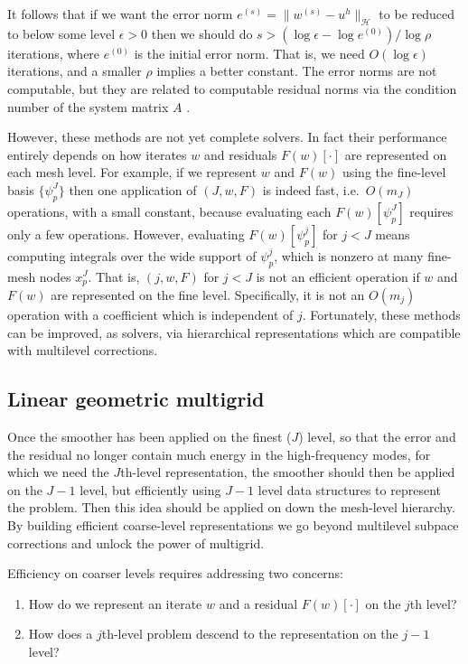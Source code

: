 \documentclass[letterpaper,final,12pt,reqno]{amsart}
\theoremstyle{claim}
\newcommand{\eps}{\epsilon}
\numberwithin{equation}{section}
\numberwithin{figure}{section}
\numberwithin{table}{section}
\begin{document}
It follows that if we want the error norm $e^{(s)} = \|w^{(s)}-u^h\|_{\mathcal{H}}$ to be reduced to below some level $\eps>0$ then we should do $s>(\log\eps - \log e^{(0)})/\log \rho$ iterations, where $e^{(0)}$ is the initial error norm.  That is, we need $O(\log\eps)$ iterations, and a smaller $\rho$ implies a better constant.  The error norms are not computable, but they are related to computable residual norms via the condition number of the system matrix $A$ \cite[Chapter 2]{Bueler2016}.

However, these  methods are not yet complete solvers.  In fact their performance entirely depends on how iterates $w$ and residuals $F(w)[\cdot]$ are represented on each mesh level.  For example, if we represent $w$ and $F(w)$ using the fine-level basis $\{\psi_p^J\}$ then one application of $(J,w,F)$ is indeed fast, i.e.~$O(m_J)$ operations, with a small constant, because evaluating each $F(w)[\psi_p^J]$ requires only a few operations.  However, evaluating $F(w)[\psi_p^j]$ for $j<J$ means computing integrals over the wide support of $\psi_p^j$, which is nonzero at many fine-mesh nodes $x_p^J$.  That is, $(j,w,F)$ for $j<J$ is not an efficient operation if $w$ and $F(w)$ are represented on the fine level.  Specifically, it is not an $O(m_j)$ operation with a coefficient which is independent of $j$.  Fortunately, these  methods can be improved, as solvers, via hierarchical representations which are compatible with multilevel corrections.

\subsection*{Linear geometric multigrid}  Once the smoother has been applied on the finest ($J$) level, so that the error and the residual no longer contain much energy in the high-frequency modes, for which we need the $J$th-level representation, the smoother should then be applied on the $J-1$ level, but efficiently using $J-1$ level data structures to represent the problem.  Then this idea should be applied on down the mesh-level hierarchy.  By building efficient coarse-level representations we go beyond multilevel subpace corrections and unlock the power of multigrid.

Efficiency on coarser levels requires addressing two concerns:
\renewcommand{\labelenumi}{\emph{\roman{enumi})}}
\begin{enumerate}
\item How do we represent an iterate $w$ and a residual $F(w)[\cdot]$ on the $j$th level?
\item How does a $j$th-level problem descend to the representation on the $j-1$ level?
\end{enumerate}
\end{document}
